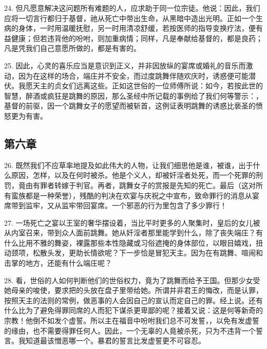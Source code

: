 24. 但凡愿意解决这问题所有难题的人，应求助于同一位宗徒。他说：因此，我们应将一切言行都归于基督，祂从死亡中带出生命，从黑暗中造出光明。正如一个生病的身体，一时用温暖抚慰，另一时用清凉舒缓，若按医师的指导变换疗法，便有益健康；但若违背他的吩咐，则加重病情；同样，凡是奉献给基督的，都是良药；凡是凭我们自己意愿所做的，都是有害的。\par

25. 因此，心灵的喜乐应当是意识到正义，并非因放纵的宴席或婚礼的音乐而激动，因为在这样的场合，端庄并不安全，而过度跳舞伴随欢庆时，诱惑便可能潜伏。我愿天主的贞女们远离这些。正如这世俗的一位师傅所说：如今，若按此世的智慧，醉酒或疯狂是跳舞的原因，那么圣经中所记载的事例给了我们何等警示：，基督的前驱，因一个跳舞女子的愿望而被斩首，这例证表明跳舞的诱惑比亵圣的愤怒更为有害。\par


\subsection{第六章}

\par

26. 既然我们不应草率地提及如此伟大的人物，让我们细思他是谁，被谁，出于什么原因，怎样，以及在何时被杀。他是个义人，却被奸淫者处死，而一个死罪的刑罚，竟由有罪者转嫁于判官。再者，跳舞女子的赏报是先知的死亡。最后（这对所有蛮族都是一种荣誉），残酷的判决在欢宴与庆祝之中宣布，致命罪行的消息从宴席带到监牢，又从监牢带回宴席。一个邪恶的行为里包含了多少罪行！\par

27. 一场死亡之宴以王室的奢华摆设着，当比平时更多的人聚集时，皇后的女儿被从内室召来，带到众人面前跳舞。她从奸淫者那里能学到什么，除了丧失端庄？有什么比用不雅的舞姿，裸露那些本性隐藏或习俗遮掩的身体部位，以眼目嬉戏，扭动颈项，松散头发，更助长情欲呢？下一步恰是冒犯天主。因为在有跳舞、喧闹和击掌的地方，还能有什么端庄呢？\par

28. 看，世俗的人如何判断他们的世俗权力，竟为了跳舞而给予王国。但那少女受她母亲的唆使，要求把的头放在盘子里带给她。所谓并非君王的悔改，而是认罪，按照天主的法则的常例，做恶事的人会因自己的宣认而定自己的罪。经上说。还有什么比为了避免得罪同席的人而犯下谋杀更卑鄙的呢？接着又说：这是何等新奇的宗教！他倒不如发个虚誓。所以主在福音中吩咐我们总不可发誓，，以免有发虚誓的缘由，也不需要得罪任何人。因此，一个无辜的人竟被杀死，只为不违背一个誓言。我知道最该憎恶哪一个。暴君的誓言比发虚誓更不可容忍。\par

